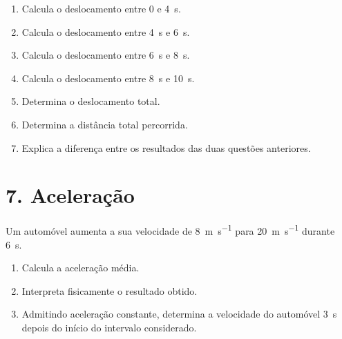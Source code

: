 \documentclass[11pt,a4paper]{article}
\newcommand{\resposta}[1][0.8]{
	\vspace{#1cm}
}
\begin{document}
	\begin{enumerate}[label=\textbf{\arabic*.},resume]
		
		\item Calcula o deslocamento entre $0$ e \SI{4}{s}.
		
		\resposta[0.9]
		
		\item Calcula o deslocamento entre \SI{4}{s} e \SI{6}{s}.
		
		\resposta[0.9]
		
		\item Calcula o deslocamento entre \SI{6}{s} e \SI{8}{s}.
		
		\resposta[0.9]
		
		\item Calcula o deslocamento entre \SI{8}{s} e \SI{10}{s}.
		
		\resposta[0.9]
		
		\item Determina o deslocamento total.
		
		\resposta[1.0]
		
		\item Determina a distância total percorrida.
		
		\resposta[1.0]
		
		\item Explica a diferença entre os resultados das duas questões anteriores.
		
		\resposta[1.0]
		
	\end{enumerate}
	
	\section{7. Aceleração}
	
	Um automóvel aumenta a sua velocidade de
	\SI{8}{m.s^{-1}} para \SI{20}{m.s^{-1}} durante \SI{6}{s}.
	
	\begin{enumerate}[label=\textbf{\arabic*.},resume]
		
		\item Calcula a aceleração média.
		
		\resposta[1.0]
		
		\item Interpreta fisicamente o resultado obtido.
		
		\resposta[1.0]
		
		\item Admitindo aceleração constante, determina a velocidade do automóvel
		\SI{3}{s} depois do início do intervalo considerado.
		
		\resposta[1.0]
		
	\end{enumerate}
	
\end{document}
